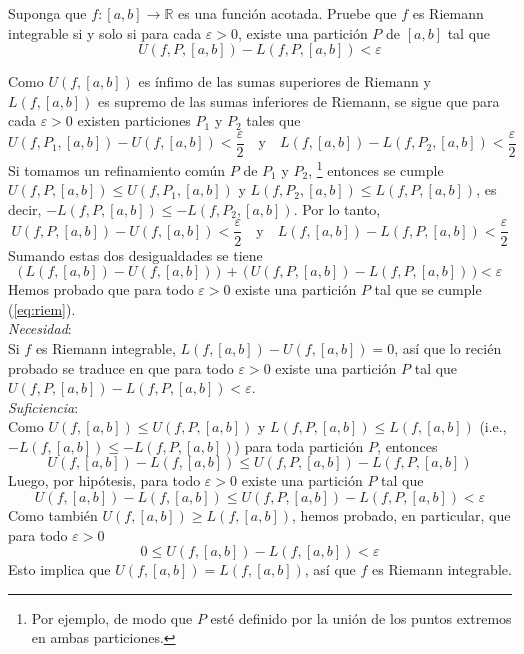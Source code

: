 
\begin{ejer}
Suponga que $f \colon [a, b] \to \mathbb{R}$ es una función acotada. Pruebe que $f$ es Riemann integrable si y solo si para cada $\varepsilon > 0$, existe una partición $P$ de $[a, b]$ tal que
\[
U(f, P, [a, b]) - L(f, P, [a, b]) < \varepsilon
\]
\end{ejer}
\begin{sol}
Como $U(f,[a,b])$ es ínfimo de las sumas superiores de Riemann y $L(f,[a,b])$ es supremo de las sumas inferiores de Riemann, se sigue que para cada $\varepsilon>0$ existen particiones $P_1$ y $P_2$ tales que 
\[
U(f,P_1,[a,b]) - U(f,[a,b]) < \frac{\varepsilon}{2}
\quad\text{y}\quad
L(f,[a,b]) - L(f,P_2,[a,b]) < \frac{\varepsilon}{2}
\]
Si tomamos un refinamiento común $P$ de $P_1$ y $P_2$,%
\footnote{
    Por ejemplo, de modo que $P$ esté definido por la unión de los puntos extremos en ambas particiones.
}
entonces se cumple $U(f,P,[a,b]) \leq U(f,P_1,[a,b])$ y $L(f,P_2,[a,b]) \leq L(f,P,[a,b])$, es decir, $-L(f,P,[a,b]) \leq -L(f,P_2,[a,b])$. Por lo tanto,
\[
U(f,P,[a,b]) - U(f,[a,b]) < \frac{\varepsilon}{2}
\quad\text{y}\quad
L(f,[a,b]) - L(f,P,[a,b]) < \frac{\varepsilon}{2}
\]
Sumando estas dos desigualdades se tiene
\begin{equation}\label{eq:riem}
\big(\, L(f,[a,b]) - U(f,[a,b]) \,\big) \,+\, \big(\, U(f,P,[a,b]) - L(f,P,[a,b]) \,\big) < \varepsilon
\end{equation}
Hemos probado que para todo $\varepsilon>0$ existe una partición $P$ tal que se cumple (\ref{eq:riem}).\vspace{1em}\\
\emph{Necesidad}:\\
Si $f$ es Riemann integrable, $L(f,[a,b]) - U(f,[a,b]) = 0$, así que lo recién probado se traduce en que para todo $\varepsilon>0$ existe una partición $P$ tal que $ U(f,P,[a,b]) - L(f,P,[a,b]) < \varepsilon$.\vspace{1em}\\
\emph{Suficiencia}:\\
Como $U(f,[a,b]) \leq U(f,P,[a,b])$ y $L(f,P,[a,b]) \leq L(f,[a,b])$ (i.e., $-L(f,[a,b]) \leq -L(f,P,[a,b])$) para toda partición $P$, entonces
\[
U(f,[a,b])-L(f,[a,b]) \leq U(f,P,[a,b])-L(f,P,[a,b])
\]
Luego, por hipótesis, para todo $\varepsilon>0$ existe una partición $P$ tal que
\[
U(f,[a,b])-L(f,[a,b]) \leq U(f,P,[a,b])-L(f,P,[a,b]) < \varepsilon
\]
Como también $U(f,[a,b])\ge L(f,[a,b])$, hemos probado, en particular, que para todo $\varepsilon>0$ 
\[
0 \leq U(f,[a,b])-L(f,[a,b]) < \varepsilon
\]
Esto implica que $U(f,[a,b])=L(f,[a,b])$, así que $f$ es Riemann integrable. 
\end{sol}